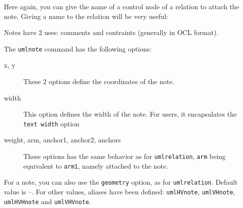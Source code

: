 \documentclass[a4paper,11pt]{report}
\begin{document}
\medskip

Here again, you can give the name of a control node of a relation to attach the note. Giving a name to the relation will be very useful:

\medskip

\begin{minipage}{0.6\textwidth}
	
\end{minipage}
\begin{minipage}{0.4\textwidth}
	\begin{center}
	\end{center}
\end{minipage}

\medskip

\medskip

Notes have 2 uses: comments and contraints (generally in OCL format).

\medskip

The {\tt umlnote} command has the following options:

\begin{description}
	\item[x, y] These 2 options define the coordinates of the note.
	\item[width] This option defines the width of the note. For \TikZ users, it encapsulates the {\tt text width} option
	\item[weight, arm, anchor1, anchor2, anchors] These options has the same behavior as for {\tt umlrelation}, {\tt arm} being equivalent to {\tt arm1}, namely attached to the note.
\end{description}

\medskip

\begin{minipage}{0.6\textwidth}
	
\end{minipage}
\begin{minipage}{0.4\textwidth}
	\begin{center}
	\end{center}
\end{minipage}

\medskip

\medskip

For a note, you can also use the {\tt geometry} option, as for {\tt umlrelation}. Default value is --. For other values, aliases have been defined: {\tt umlHVnote}, {\tt umlVHnote}, {\tt umlHVHnote} and {\tt umlVHVnote}.
\end{document}
